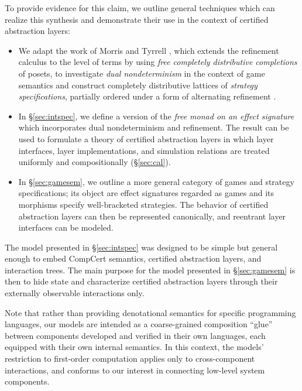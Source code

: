 \documentclass[draft,11pt]{report}
\begin{document}
To provide evidence for this claim,
we outline general techniques
which can realize this synthesis
and demonstrate their use
in the context of certified abstraction layers:
\begin{itemize}
\item
  We adapt the work of Morris and Tyrrell \citep{augtyp,dndf},
  which extends the refinement calculus to the level of terms
  by using \emph{free completely distributive completions} of posets,
  to investigate \emph{dual nondeterminism}
  in the context of game semantics
  and construct
  completely distributive lattices of
  \emph{strategy specifications},
  partially ordered
  under a form of alternating refinement
  \citep{altref}.
\item
  In \S\ref{sec:intspec},
  we define a version of the
  \emph{free monad on an effect signature}
  which incorporates dual nondeterminism and refinement.
  The result can be used to formulate a theory of certified abstraction
  layers in which
  layer interfaces, layer implementations, and simulation relations
  are treated uniformly and compositionally (\S\ref{sec:cal}).
\item
  In \S\ref{sec:gamesem},
  we outline a more general category of games and
  strategy specifications;
  its object are effect signatures regarded as games
  and its morphisms specify well-bracketed strategies.
  The behavior of certified abstraction layers
  can then be represented canonically,
  and reentrant layer interfaces can be modeled.
\end{itemize}

The model presented in \S\ref{sec:intspec} was designed to be simple but
general enough to embed CompCert semantics, certified
abstraction layers, and interaction trees. The main purpose for
the model presented in \S\ref{sec:gamesem} is then to hide state and
characterize certified abstraction layers through
their externally observable interactions only.

Note that rather than providing
denotational semantics for specific programming
languages, our models are intended as a coarse-grained composition
``glue'' between components developed and verified in their own
languages, each equipped with their own internal semantics.
In this context,
the models' restriction to first-order computation
applies only to cross-component interactions,
and conforms to our interest in connecting
low-level system components.
\end{document}
